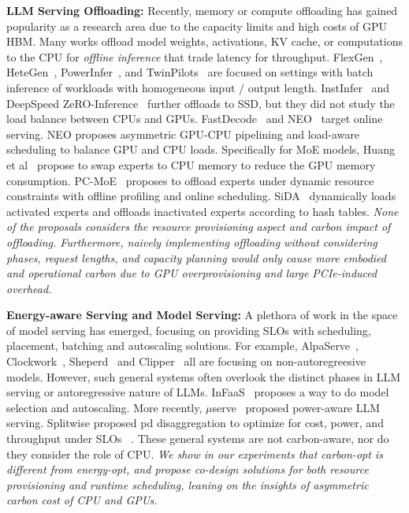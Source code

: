 \textbf{LLM Serving Offloading:} Recently, memory or compute offloading has gained popularity as a research area due to the capacity limits and high costs of GPU HBM. Many works offload model weights, activations, KV cache, or computations to the CPU for \textit{offline inference} that trade latency for throughput. FlexGen~\cite{flexgen}, HeteGen~\cite{hetegen}, PowerInfer~\cite{song2023powerinfer}, and TwinPilots~\cite{twinpilots} are focused on settings with batch inference of workloads with homogeneous input / output length. 
InstInfer~\cite{instinfer} and DeepSpeed ZeRO-Inference~\cite{aminabadi2022deepspeed} further offloads to SSD, but they did not study the load balance between CPUs and GPUs.
FastDecode~\cite{fastdecode} and NEO~\cite{jiang2024neo} target online serving. NEO proposes asymmetric GPU-CPU pipelining and load-aware scheduling to balance GPU and CPU loads. Specifically for MoE models, Huang et al~\cite{huang_towards_2023} propose to swap experts to CPU memory to reduce the GPU memory consumption. PC-MoE~\cite{kong_serving_2023} proposes to offload experts under dynamic resource constraints with offline profiling and online scheduling. 
SiDA~\cite{Du2023SiDASD} dynamically loads activated experts and offloads inactivated experts according to hash tables.  
\textit{None of the proposals considers the resource provisioning aspect and carbon impact of offloading. Furthermore, naively implementing offloading without considering phases, request lengths, and capacity planning would only cause more embodied and operational carbon due to GPU overprovisioning and large PCIe-induced overhead. }


\textbf{Energy-aware Serving and Model Serving:} A plethora of work in the space of model serving has emerged, focusing on providing SLOs with scheduling, placement, batching and autoscaling solutions. For example, AlpaServe~\cite{li2023alpaserve}, Clockwork~\cite{gujarati2020serving}, Sheperd~\cite{zhang2023shepherd} and Clipper~\cite{crankshaw2017clipper} all are focusing on non-autoregreesive models. However, such general systems often overlook the distinct phases in LLM serving or autoregressive nature of LLMs. 
InFaaS~\cite{romero2021infaas} proposes a way to do model selection and autoscaling. More recently, $\mu$serve~\cite{qiu2024muserve} proposed power-aware LLM serving. 
Splitwise proposed pd disaggregation to optimize for cost, power, and throughput under SLOs ~\cite{patel2023splitwise}. These general systems are not carbon-aware, nor do they consider the role of CPU. \textit{We show in our experiments that carbon-opt is different from energy-opt, and propose co-design solutions for both resource provisioning and runtime scheduling, leaning on the insights of asymmetric carbon cost of CPU and GPUs. }
